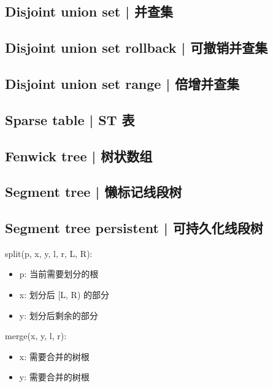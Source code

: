 \documentclass[8pt,a4paper]{article}
\newcommand{\code}[1]{
    
}
\newcommand{\txt}[1]{\par\noindent\footnotesize #1}
\begin{document}
\begin{multicols}{2}
    \subsection{Disjoint union set | 并查集}
        \code{src/data_structure/disjoint_union_set.cpp}

    \subsection{Disjoint union set rollback | 可撤销并查集}
        \code{src/data_structure/disjoint_union_set_rollback.cpp}

    \subsection{Disjoint union set range | 倍增并查集}
        \code{src/data_structure/disjoint_union_set_range.cpp}

    \subsection{Sparse table | ST 表}
        \code{src/data_structure/sparse_table.cpp}

    \subsection{Fenwick tree | 树状数组}
        \code{src/data_structure/fenwick_tree.cpp}

    \subsection{Segment tree | 懒标记线段树}
        \code{src/data_structure/segment_tree.cpp}

    \subsection{Segment tree persistent | 可持久化线段树}
        \txt{split(p, x, y, l, r, L, R):}
        \txt{\begin{itemize}
            \item p: 当前需要划分的根
            \item x: 划分后 [L, R) 的部分 
            \item y: 划分后剩余的部分
        \end{itemize}}
        \txt{merge(x, y, l, r):}
        \txt{\begin{itemize}
            \item x: 需要合并的树根
            \item y: 需要合并的树根
        \end{itemize}}


\end{multicols}
\end{document}
